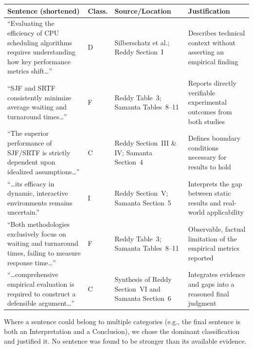 \documentclass[11pt, a4paper]{article}
\begin{document}
\begin{longtable}{@{}p{4.5cm} p{1.5cm} p{4cm} p{4cm}@{}}
    \toprule
    \textbf{Sentence (shortened)} & \textbf{Class.} & \textbf{Source/Location} & \textbf{Justification} \\
    \midrule
    \endhead
    ``Evaluating the efficiency of CPU scheduling algorithms requires understanding how key performance metrics shift\ldots'' & D & Silberschatz et al.; Reddy Section~I & Describes technical context without asserting an empirical finding \\
    \midrule
    ``SJF and SRTF consistently minimize average waiting and turnaround times\ldots'' & F & Reddy Table~3; Samanta Tables~8--11 & Reports directly verifiable experimental outcomes from both studies \\
    \midrule
    ``The superior performance of SJF/SRTF is strictly dependent upon idealized assumptions\ldots'' & C & Reddy Section~III \& IV; Samanta Section~4 & Defines boundary conditions necessary for results to hold \\
    \midrule
    ``\ldots its efficacy in dynamic, interactive environments remains uncertain.'' & I & Reddy Section~V; Samanta Section~5 & Interprets the gap between static results and real-world applicability \\
    \midrule
    ``Both methodologies exclusively focus on waiting and turnaround times, failing to measure response time\ldots'' & F & Reddy Table~3; Samanta Tables~8--11 & Observable, factual limitation of the empirical metrics reported \\
    \midrule
    ``\ldots comprehensive empirical evaluation is required to construct a defensible argument\ldots'' & C & Synthesis of Reddy Section~VI and Samanta Section~6 & Integrates evidence and gaps into a reasoned final judgment \\
    \bottomrule
\end{longtable}

Where a sentence could belong to multiple categories (e.g., the final sentence is both an Interpretation and a Conclusion), we chose the dominant classification and justified it. No sentence was found to be stronger than its available evidence.
\end{document}
